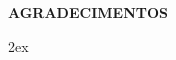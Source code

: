 \thispagestyle{empty}

\begin{center}
{\large \textbf{AGRADECIMENTOS}}
\end{center}



\begin{trivlist}  \itemsep 2ex  \normalsize

\item \lipsum[2]

\lipsum[1-3]

\end{trivlist}